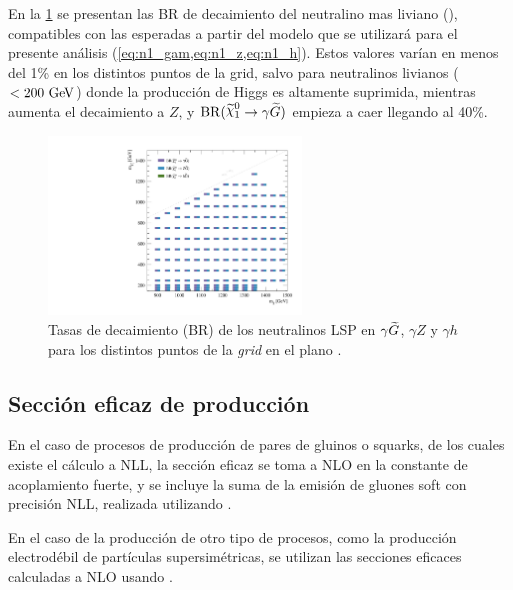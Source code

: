 En la \cref{fig:signal_br_n1} se presentan las BR de decaimiento del neutralino
mas liviano (\ninoone), compatibles con las esperadas a partir del modelo que se
utilizará para el presente análisis (\cref{eq:n1_gam,eq:n1_z,eq:n1_h}). Estos
valores varían en menos del 1\% en los distintos puntos de la grid, salvo para
neutralinos livianos ($<200\gev$) donde la producción de Higgs es altamente
suprimida, mientras aumenta el decaimiento a $Z$, y $\mathrm{BR}(\ninoone \to
\gam \gravino)$ empieza a caer llegando al 40\%.

\begin{figure}[!htb]
  \centering

  \includegraphics[width=0.6\textwidth]{figures/br_n1_X}

  \caption{Tasas de decaimiento (BR) de los neutralinos LSP en $\gamma\widetilde{G}$, $\gamma Z$ y
  $\gamma h$ para los distintos puntos de la \emph{grid} en el plano \mgmn.}
  \label{fig:signal_br_n1}
\end{figure}



\subsection{Sección eficaz de producción}
\label{sec:xs_calc}

En el caso de procesos de producción de pares de gluinos o squarks, de los cuales
existe el cálculo a NLL, la sección eficaz se toma a NLO en la constante de acoplamiento
fuerte, y se incluye la suma de la emisión de gluones soft con precisión NLL,
realizada utilizando {\nllfast}\cite{Kramer:2012bx,Beenakker:1996ch,Kulesza:2008jb,Kulesza:2009kq,Beenakker:2009ha,Beenakker:2011fu}.

En el caso de la producción de otro tipo de procesos, como la producción electrodébil de
partículas supersimétricas, se utilizan
las secciones eficaces calculadas a NLO usando {\prospino} \cite{Beenakker:1996ed}.


